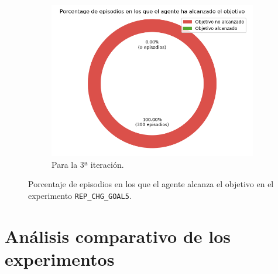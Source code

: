\begin{figure}
\begin{subfigure}{.5\textwidth}
    \end{subfigure}
    \begin{subfigure}{.5\textwidth}
        \centering
        \includegraphics[scale=0.3]{cap5_experimentacion/images/CHANGE_GOAL-20_09-22_13-2, 1, 0_it3_porcentajeResuelto.png}
        \caption{Para la 3ª iteración.}
        \label{fig:CHANGE_GOAL-20_09-22_13-2, 1, 0_it3_porcentajeResuelto}
    \end{subfigure}%
    \caption{Porcentaje de episodios en los que el agente alcanza el objetivo en el experimento \texttt{REP\_CHG\_GOAL5}.}
    \label{fig:CHANGE_GOAL-20_09-22_13-2, 1, 0_porcentajeResuelto}
\end{figure}

\section{Análisis comparativo de los experimentos}


